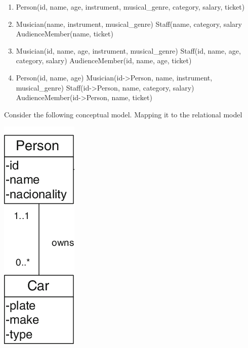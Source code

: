 \documentclass{bdad}
\begin{document}
\begin{enumerate}
    \item \checkbox
\begin{blocklisting}
Person(id, name, age, instrument, musical_genre, category, salary, ticket)
\end{blocklisting}
    \item \checkbox
\begin{blocklisting}
Musician(name, instrument, musical_genre)
Staff(name, category, salary
AudienceMember(name, ticket)
\end{blocklisting}
    \item \checkbox
\begin{blocklisting}
Musician(id, name, age, instrument, musical_genre)
Staff(id, name, age, category, salary)
AudienceMember(id, name, age, ticket)
\end{blocklisting}
    \item \checkbox
\begin{blocklisting}
Person(id, name, age)
Musician(id->Person, name, instrument, musical_genre)
Staff(id->Person, name, category, salary)
AudienceMember(id->Person, name, ticket)
\end{blocklisting}
\end{enumerate}

\newpage
{}
Consider the following conceptual model. Mapping it to the relational model

\begin{center}
    \includegraphics[scale=0.8]{2020T-08.png}
\end{center}
\end{document}
